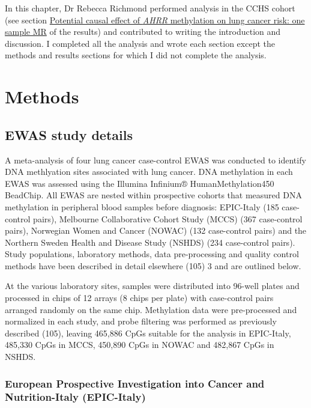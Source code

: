 \documentclass[11pt,twoside]{bristolthesis}
\begin{document}
In this chapter, Dr Rebecca Richmond performed analysis in the CCHS cohort (see section \protect\hyperlink{potential-causal-effect-of-ahrr-methylation-on-lung-cancer-risk-one-sample-mr}{Potential causal effect of \emph{AHRR} methylation on lung cancer risk: one sample MR} of the results) and contributed to writing the introduction and discussion. I completed all the analysis and wrote each section except the methods and results sections for which I did not complete the analysis.

\hypertarget{methods-3}{%
\section{Methods}\label{methods-3}}

\hypertarget{ewas-study-details}{%
\subsection{EWAS study details}\label{ewas-study-details}}

A meta-analysis of four lung cancer case-control EWAS was conducted to identify DNA methlyation sites associated with lung cancer. DNA methylation in each EWAS was assessed using the Illumina Infinium® HumanMethylation450 BeadChip. All EWAS are nested within prospective cohorts that measured DNA methylation in peripheral blood samples before diagnosis: EPIC-Italy (185 case-control pairs), Melbourne Collaborative Cohort Study (MCCS) (367 case-control pairs), Norwegian Women and Cancer (NOWAC) (132 case-control pairs) and the Northern Sweden Health and Disease Study (NSHDS) (234 case-control pairs). Study populations, laboratory methods, data pre-processing and quality control methods have been described in detail elsewhere (105) 3 and are outlined below.

At the various laboratory sites, samples were distributed into 96-well plates and processed in chips of 12 arrays (8 chips per plate) with case-control pairs arranged randomly on the same chip. Methylation data were pre-processed and normalized in each study, and probe filtering was performed as previously described (105), leaving 465,886 CpGs suitable for the analysis in EPIC-Italy, 485,330 CpGs in MCCS, 450,890 CpGs in NOWAC and 482,867 CpGs in NSHDS.

\hypertarget{european-prospective-investigation-into-cancer-and-nutrition-italy-epic-italy}{%
\subsubsection{European Prospective Investigation into Cancer and Nutrition-Italy (EPIC-Italy)}\label{european-prospective-investigation-into-cancer-and-nutrition-italy-epic-italy}}
\end{document}
